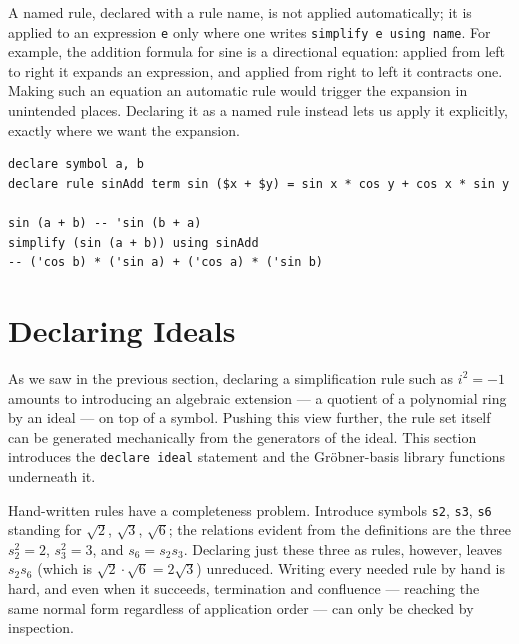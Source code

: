 A named rule, declared with a rule name, is not applied automatically; it is applied to an expression \lstinline{e} only where one writes \lstinline{simplify e using name}.
For example, the addition formula for sine is a directional equation: applied from left to right it expands an expression, and applied from right to left it contracts one.
Making such an equation an automatic rule would trigger the expansion in unintended places.
Declaring it as a named rule instead lets us apply it explicitly, exactly where we want the expansion.
\begin{lstlisting}[language=egison,numbers=none]
declare symbol a, b
declare rule sinAdd term sin ($x + $y) = sin x * cos y + cos x * sin y

sin (a + b) -- 'sin (b + a)
simplify (sin (a + b)) using sinAdd
-- ('cos b) * ('sin a) + ('cos a) * ('sin b)
\end{lstlisting}

\section{Declaring Ideals}\label{casdetail-ideal}

As we saw in the previous section, declaring a simplification rule such as $i^2 = -1$ amounts to introducing an algebraic extension --- a quotient of a polynomial ring by an ideal --- on top of a symbol.
Pushing this view further, the rule set itself can be generated mechanically from the generators of the ideal.
This section introduces the \lstinline{declare ideal} statement and the Gr\"obner-basis library functions underneath it.

Hand-written rules have a completeness problem.
Introduce symbols \lstinline{s2}, \lstinline{s3}, \lstinline{s6} standing for $\sqrt{2}$, $\sqrt{3}$, $\sqrt{6}$; the relations evident from the definitions are the three $s_2^2 = 2$, $s_3^2 = 3$, and $s_6 = s_2 s_3$.
Declaring just these three as rules, however, leaves $s_2 s_6$ (which is $\sqrt{2}\cdot\sqrt{6} = 2\sqrt{3}$) unreduced.
Writing every needed rule by hand is hard, and even when it succeeds, termination and confluence --- reaching the same normal form regardless of application order --- can only be checked by inspection.


